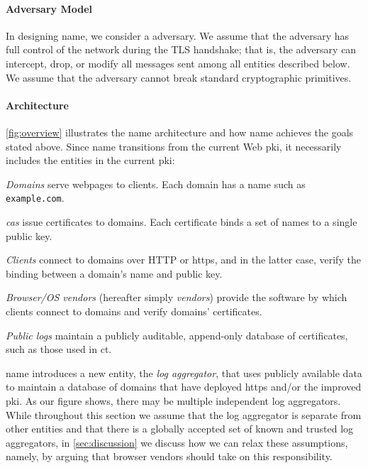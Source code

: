 \paragraph{Adversary Model}

In designing \ac{name}, we consider a  adversary. 
We assume that the adversary has full
control of the network during the TLS handshake; that is, the adversary can
intercept, drop, or modify all messages sent among all entities described
below. We assume that the adversary cannot break standard cryptographic primitives.

\paragraph{Architecture}

\autoref{fig:overview} illustrates the \ac{name} architecture and how \ac{name}
achieves the goals stated above. Since \ac{name} transitions from the current
Web \ac{pki}, it necessarily includes the entities in the current \ac{pki}:
\begin{compactitem}
\item \emph{Domains} serve webpages to clients. Each domain has a name such as
  \texttt{example.com}.
\item \emph{\acp{ca}} issue certificates to domains. Each certificate binds a
  set of names to a single public key.
\item \emph{Clients} connect to domains over HTTP or \ac{https}, and in the
  latter case, verify the binding between a domain's name and public key.
\item \emph{Browser/OS vendors} (hereafter simply \emph{vendors}) provide the
  software by which clients connect to domains and verify domains' certificates.
\item \emph{Public logs} maintain a publicly auditable, append-only database of
  certificates, such as those used in \ac{ct}.
\end{compactitem}
\ac{name} introduces a new entity, the \emph{log aggregator}, that uses publicly
available data to maintain a database of domains that have deployed \ac{https}
and/or the improved \ac{pki}. As our figure shows, there may be multiple
independent log aggregators. While throughout this section we assume that the
log aggregator is separate from other entities and that there is a globally
accepted set of known and trusted log aggregators, in \autoref{sec:discussion}
we discuss how we can relax these assumptions, namely, by arguing that browser
vendors should take on this responsibility.

